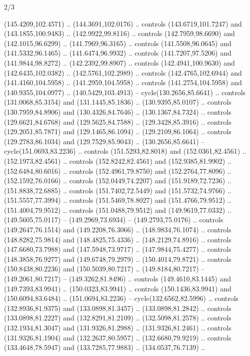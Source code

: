 \begin{flagdescription}{2/3}
\begin{scope}[xshift=0.5\flaglength,yshift=0.5\flagwidth,scale=\flagwidth/180]
\begin{scope}[y=0.8pt, x=0.8pt, yscale=-1,shift={(-168.75,-108.75)}]
  (145.4209,102.4571) .. (144.3691,102.0176) .. controls (143.6719,101.7247) and
  (143.1855,100.9483) .. (142.9922,99.8116) .. controls (142.7959,98.6690) and
  (142.1015,96.6299) .. (141.7969,96.3165) .. controls (141.5508,96.0645) and
  (141.5332,96.1465) .. (141.6474,96.9932) .. controls (141.7207,97.5206) and
  (141.9844,98.8272) .. (142.2392,99.8907) .. controls (142.4941,100.9630) and
  (142.6435,102.0382) .. (142.5761,102.2989) .. controls (142.4765,102.6944) and
  (141.4160,104.5958) .. (141.2959,104.5958) .. controls (141.2754,104.5958) and
  (140.9355,104.0977) .. (140.5429,103.4913) -- cycle(130.2656,85.6641) ..
  controls (131.0068,85.3154) and (131.1445,85.1836) .. (130.9395,85.0107) ..
  controls (130.7959,84.8906) and (130.4326,84.7646) .. (130.1367,84.7324) ..
  controls (129.6621,84.6768) and (129.5625,84.7588) .. (129.3428,85.3916) ..
  controls (129.2051,85.7871) and (129.1465,86.1094) .. (129.2109,86.1064) ..
  controls (129.2783,86.1034) and (129.7529,85.9043) .. (130.2656,85.6641) --
  cycle(151.0693,83.2236) .. controls (151.5293,82.8018) and (152.0361,82.4561)
  .. (152.1973,82.4561) .. controls (152.8242,82.4561) and (152.9385,81.9902) ..
  (152.6484,80.6016) .. controls (152.4961,79.8750) and (152.2764,77.8096) ..
  (152.1592,76.0166) .. controls (152.0449,74.2207) and (151.9189,72.7236) ..
  (151.8838,72.6885) .. controls (151.7402,72.5449) and (151.5732,74.9766) ..
  (151.5557,77.3994) .. controls (151.5469,78.8027) and (151.4766,79.9512) ..
  (151.4004,79.9512) .. controls (151.0488,79.9512) and (149.9619,77.0332) ..
  (149.5605,75.0117) -- (149.2969,73.6934) -- (149.2793,75.0176) .. controls
  (149.2647,76.1514) and (149.2208,76.3066) .. (148.9834,76.1074) .. controls
  (148.8282,75.9814) and (148.4825,75.4336) .. (148.2129,74.8916) .. controls
  (147.6680,73.7988) and (147.5948,73.9717) .. (147.9844,75.4277) .. controls
  (148.3858,76.9277) and (149.6748,79.2979) .. (150.4014,79.8721) .. controls
  (150.8438,80.2236) and (150.5039,80.7217) .. (149.8184,80.7217) --
  (149.2061,80.7217) -- (149.3262,81.8496) .. controls (149.4610,83.1445) and
  (149.7393,83.9941) .. (150.0323,83.9941) .. controls (150.1436,83.9941) and
  (150.6094,83.6484) .. (151.0694,83.2236) -- cycle(132.6562,82.5996) ..
  controls (132.8936,81.9375) and (133.0898,81.3457) .. (133.0898,81.2842) ..
  controls (133.0898,81.2227) and (132.8291,81.2109) .. (132.5098,81.2578) ..
  controls (132.1934,81.3047) and (131.9326,81.2988) .. (131.9326,81.2461) ..
  controls (131.9326,81.1904) and (132.2637,80.5957) .. (132.6680,79.9219) ..
  controls (133.4648,78.5947) and (133.7285,77.9883) .. (134.0537,76.7139) ..

\end{scope}
\end{scope}
\end{flagdescription}
